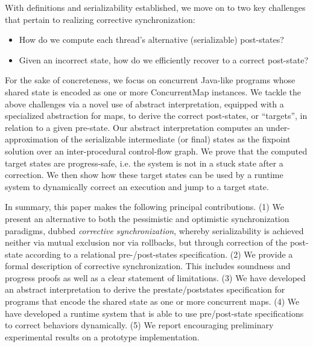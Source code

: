 %
With definitions and serializability established, we move on to two key challenges
that pertain to realizing corrective synchronization:
\begin{itemize}
\item How do we compute each thread's alternative (serializable) post-states?
\item Given an incorrect state, how do we efficiently recover to a correct post-state?
\end{itemize}
%
For the sake of concreteness, we focus on concurrent Java-like
programs whose shared state is encoded as one or more {\sf
  ConcurrentMap} instances.  We tackle the above challenges via a
novel use of abstract interpretation, equipped with a specialized
abstraction for maps, to derive the correct post-states, or ``targets'', in relation to
a given pre-state.
%
Our abstract interpretation computes an
under-approximation of the serializable intermediate (or final) states
as the fixpoint solution over an inter-procedural control-flow graph.
%
We prove that the computed target states are progress-safe, i.e. the system is not in a stuck state after a correction.
%
We then show how these target states can be used by a runtime system to
dynamically correct an execution and jump to a target state. 



In summary, this paper makes the following principal contributions.
  (1) We present an alternative to both the pessimistic and optimistic synchronization paradigms, dubbed \emph{corrective synchronization}, whereby serializability is achieved neither via mutual exclusion nor via rollbacks, but through correction of the post-state according to a relational pre-/post-states specification.
(2) We provide a formal description of corrective synchronization. This includes soundness and progress proofs as well as a clear statement of limitations.
	(3) We have developed an abstract interpretation to derive the prestate/poststates specification for programs that encode the shared state as one or more concurrent maps. 
(4) We have developed a runtime system that is able to use
pre/post-state specifications to correct behaviors dynamically.
%
(5) We report encouraging preliminary experimental results on
a prototype implementation.

